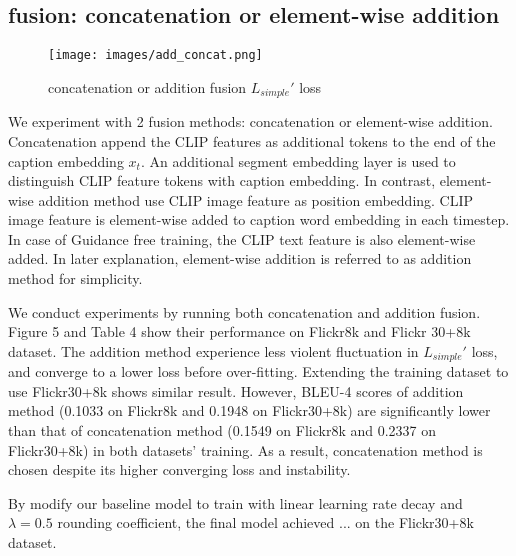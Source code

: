 \documentclass{article}
\begin{document}
\subsection{fusion: concatenation or element-wise addition}
\label{sec:fusion-exp}
\begin{figure}
  \centering
  \texttt{[image: images/add\_concat.png]}
  \caption{concatenation or addition fusion $L_{simple}'$ loss}
  \label{fig:fusion}
\end{figure}

We experiment with 2 fusion methods: concatenation or element-wise addition. Concatenation append the CLIP features as additional tokens to the end of the caption embedding $x_t$. An additional segment embedding layer is used to distinguish CLIP feature tokens with caption embedding. In contrast, element-wise addition method use CLIP image feature as position embedding. CLIP image feature is element-wise added to caption word embedding in each timestep. In case of Guidance free training, the CLIP text feature is also element-wise added. In later explanation, element-wise addition is referred to as addition method for simplicity.

We conduct experiments by running both concatenation and addition fusion. Figure 5 and Table 4 show their performance on Flickr8k and Flickr 30+8k dataset. The addition method experience less violent fluctuation in $L_{simple}'$ loss, and converge to a lower loss before over-fitting. Extending the training dataset to use Flickr30+8k shows similar result. However, BLEU-4 scores of addition method (0.1033 on Flickr8k and 0.1948 on Flickr30+8k) are significantly lower than that of concatenation method (0.1549 on Flickr8k and 0.2337 on Flickr30+8k) in both datasets' training. As a result, concatenation method is chosen despite its higher converging loss and instability. 

By modify our baseline model to train with linear learning rate decay and $\lambda = 0.5$ rounding coefficient, the final model achieved ... on the Flickr30+8k dataset.
\end{document}
